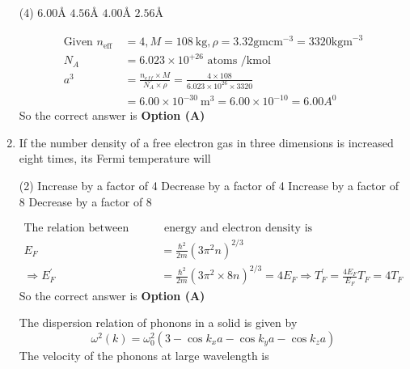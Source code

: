 \begin{enumerate}
\begin{tasks}(4)
\task[\textbf{A.}] $6.00 \text{\AA}$
\task[\textbf{B.}]  $4.56 \text{\AA}$
\task[\textbf{C.}] $4.00 \text{\AA}$
\task[\textbf{D.}] $2.56 \text{\AA}$
\end{tasks}
\begin{answer}
$$\begin{aligned}
\text{Given }n_{\text {eff }}&=4, M=108 \mathrm{~kg}, \rho=3.32 \mathrm{gm} \mathrm{cm}^{-3}=3320 \mathrm{kgm}^{-3}\\
N_{A}&=6.023 \times 10^{+26}\text{ atoms }/ \mathrm{kmol}\\
a^{3}&=\frac{n_{e f f} \times M}{N_{A} \times \rho}=\frac{4 \times 108}{6.023 \times 10^{26} \times 3320}\\&=6.00 \times 10^{-30} \mathrm{~m}^{3}=6.00 \times 10^{-10}=6.00 A^{0}
\end{aligned}$$
So the correct answer is \textbf{Option (A)}
\end{answer}
\item If the number density of a free electron gas in three dimensions is increased eight times, its Fermi temperature will
{}

\begin{tasks}(2)
\task[\textbf{A.}] Increase by a factor of 4
\task[\textbf{B.}]  Decrease by a factor of 4
\task[\textbf{C.}] Increase by a factor of 8
\task[\textbf{D.}]  Decrease by a factor of 8
\end{tasks}
\begin{answer}
$$\begin{aligned}
\text{The relation between Fermi}&\text{ energy and electron density is} \\
	E_{F}&=\frac{\hbar^{2}}{2 m}\left(3 \pi^{2} n\right)^{2 / 3}\\
\Rightarrow E_{F}^{\prime}&=\frac{\hbar^{2}}{2 m}\left(3 \pi^{2} \times 8 n\right)^{2 / 3}=4 E_{F} \Rightarrow T_{F}^{\prime}=\frac{4 E_{F}}{E_{F}} T_{F}=4 T_{F}
\end{aligned}$$
So the correct answer is \textbf{Option (A)}
\end{answer}
	\question The dispersion relation of phonons in a solid is given by
$$
\omega^{2}(k)=\omega_{0}^{2}\left(3-\cos k_{x} a-\cos k_{y} a-\cos k_{z} a\right)
$$
The velocity of the phonons at large wavelength is
{}


\end{enumerate}
